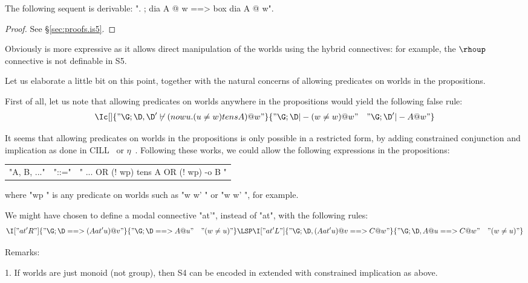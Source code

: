 \documentclass{article}
\begin{document}
\begin{thm}[\hyll is S5]
  The following sequent is derivable: ". ; dia A @ w ==> box dia A @ w".
\end{thm}

\begin{proof}
  See \S\ref{sec:proofs.is5}.
\end{proof}
Obviously \hyll is more expressive as it allows direct manipulation of the worlds using
the hybrid connectives: for example, the $\rhoup$ connective is not definable in S5.

Let us elaborate a little bit on this point, together with the natural concerns of
allowing predicates on worlds in the propositions.

First of all, let us note that allowing predicates on worlds anywhere in the propositions
would yield the following false rule:
\begin{gather*}
  \Ic[]{"\G ; \D, \D' \not\vdash (now u. (u \neq w) tens A) @ w"}
       {"\G ; \D |- (w \neq w) @ w" \quad "\G ; \D' |- A @ w"}
\end{gather*}


It seems that allowing predicates on worlds in the propositions is only possible 
in a restricted form, by adding constrained conjunction and implication 
as done in CILL~\cite{saranli07icra} or $\eta$~\cite{deyoung08csf}. 
Following these works, we could allow the following expressions in the propositions:

\smallskip
\bgroup
\begin{tabular}{l@{\ }r@{\ }l}
  "A, B, ..." & "::=" & " ... OR (! wp)  tens A OR (! wp) -o B " \\ 
\end{tabular}
\egroup

where  "wp " is any predicate on worlds such as "w \neq w' " or "w \le w' ", for example. 

We might have chosen to define a modal connective "at'", instead of "at", with the following 
rules:
\begin{gather*}
     \I["at' R"]{"\G ; \D ==> (A at' u) @ v"}{"\G ; \D ==> A @ u" \quad "(w \neq u)"}
     \LSP
     \I["at' L"]{"\G ; \D, (A at' u) @ v ==> C @ w"}
                {"\G ; \D, A @ u ==> C @ w" \quad "(w \neq u)"}
   \end{gather*}

Remarks:

1. If worlds are just monoid (not group), 
then S4 can be encoded in \hyll extended with constrained implication as above.
\end{document}
